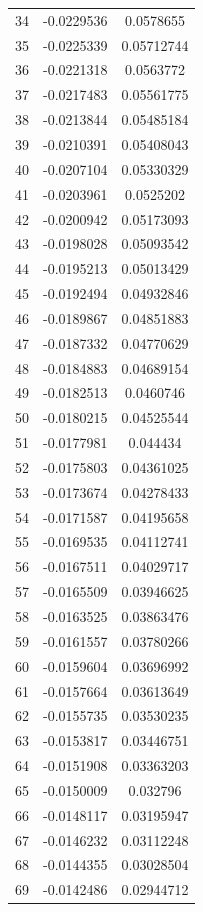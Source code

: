 \documentclass[a4paper, 11pt, oneside]{report}
\begin{document}
{\begin{longtable}{|c|c|c|}
34  & -0.0229536 & 0.0578655  \\
35  & -0.0225339 & 0.05712744 \\
36  & -0.0221318 & 0.0563772  \\
37  & -0.0217483 & 0.05561775 \\
38  & -0.0213844 & 0.05485184 \\
39  & -0.0210391 & 0.05408043 \\
40  & -0.0207104 & 0.05330329 \\
41  & -0.0203961 & 0.0525202  \\
42  & -0.0200942 & 0.05173093 \\
43  & -0.0198028 & 0.05093542 \\
44  & -0.0195213 & 0.05013429 \\
45  & -0.0192494 & 0.04932846 \\
46  & -0.0189867 & 0.04851883 \\
47  & -0.0187332 & 0.04770629 \\
48  & -0.0184883 & 0.04689154 \\
49  & -0.0182513 & 0.0460746  \\
50  & -0.0180215 & 0.04525544 \\
51  & -0.0177981 & 0.044434   \\
52  & -0.0175803 & 0.04361025 \\
53  & -0.0173674 & 0.04278433 \\
54  & -0.0171587 & 0.04195658 \\
55  & -0.0169535 & 0.04112741 \\
56  & -0.0167511 & 0.04029717 \\
57  & -0.0165509 & 0.03946625 \\
58  & -0.0163525 & 0.03863476 \\
59  & -0.0161557 & 0.03780266 \\
60  & -0.0159604 & 0.03696992 \\
61  & -0.0157664 & 0.03613649 \\
62  & -0.0155735 & 0.03530235 \\
63  & -0.0153817 & 0.03446751 \\
64  & -0.0151908 & 0.03363203 \\
65  & -0.0150009 & 0.032796   \\
66  & -0.0148117 & 0.03195947 \\
67  & -0.0146232 & 0.03112248 \\
68  & -0.0144355 & 0.03028504 \\
69  & -0.0142486 & 0.02944712 \\

\end{longtable}}
\end{document}

